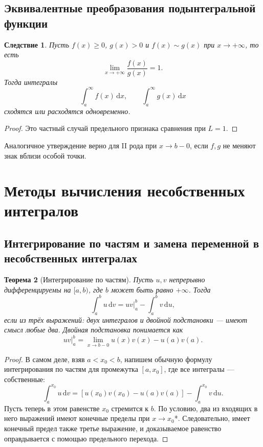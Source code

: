\documentclass[coursework, och, times]{SCWorks1}
\newtheorem{theorem}{Теорема}
\newtheorem{corollary}[theorem]{Следствие}
\newcommand{\dd}{\,\mathrm{d}}
\renewcommand{\ge}{\geqslant}
\begin{document}
\subsection{Эквивалентные преобразования подынтегральной функции}

\begin{corollary}
Пусть \(f(x)\ge0\), \(g(x)>0\) и \(f(x)\sim g(x)\) при \(x\to+\infty\), то есть
\[
\lim_{x\to+\infty}\frac{f(x)}{g(x)}=1.
\]
Тогда интегралы
\[
\int_a^\infty f(x)\dd x,\qquad \int_a^\infty g(x)\dd x
\]
сходятся или расходятся одновременно.
\end{corollary}
\begin{proof}
Это частный случай предельного признака сравнения при $L=1$.
\end{proof}

Аналогичное утверждение верно для II рода при \(x\to b-0\), если \(f,g\) не меняют знак вблизи особой точки.

\section{Методы вычисления несобственных интегралов}

\subsection{Интегрирование по частям и замена переменной в несобственных интегралах}

\begin{theorem}[Интегрирование по частям]
Пусть \(u,v\) непрерывно дифференцируемы на \([a,b)\), где \(b\) может быть равно \(+\infty\). Тогда
\[
\int_a^b u\dd v
=
uv\big|_a^b-\int_a^b v\dd u,
\]
если из трёх выражений: двух интегралов и двойной подстановки — имеют смысл любые два. Двойная подстановка понимается как
\[
uv\big|_a^b=\lim_{x\to b-0}u(x)v(x)-u(a)v(a).
\]
\end{theorem}
\begin{proof}
В самом деле, взяв \(a < x_0 < b\), напишем обычную формулу интегрирования по частям для промежутка \([a, x_0]\), где все интегралы — собственные:
\[
\int_a^{x_0} u \dd v = [u(x_0)v(x_0) - u(a)v(a)] - \int_a^{x_0} v \dd u.
\]
Пусть теперь в этом равенстве \(x_0\) стремится к \(b\). По условию, два из входящих в него выражений имеют конечные пределы при \(x \to x_0\)*. Следовательно, имеет конечный предел также третье выражение, и доказываемое равенство оправдывается с помощью предельного перехода.
\end{proof}
\end{document}
